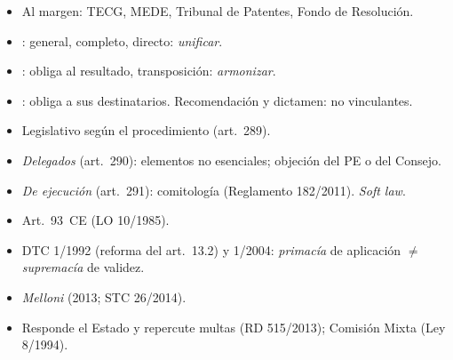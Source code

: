 \documentclass{article}
\begin{document}
\begin{columnas}
\begin{itemize}
\item Al margen: TECG, MEDE, Tribunal de Patentes, Fondo de Resolución.
\end{itemize}
\begin{itemize}
\item {}: general, completo, directo: \emph{unificar}.
\item {}: obliga al resultado, transposición: \emph{armonizar}.
\item {}: obliga a sus destinatarios. Recomendación y dictamen: no vinculantes.
\item Legislativo según el procedimiento (art.~289).
\item \emph{Delegados} (art.~290): elementos no esenciales; objeción del PE o del Consejo.
\item \emph{De ejecución} (art.~291): comitología (Reglamento 182/2011). \emph{Soft law}.
\end{itemize}
\begin{itemize}
\item Art.~93~CE (LO 10/1985).
\item DTC 1/1992 (reforma del art.~13.2) y 1/2004: \emph{primacía} de aplicación $\neq$ \emph{supremacía} de validez.
\item \emph{Melloni} (2013; STC 26/2014).
\item Responde el Estado y repercute multas (RD 515/2013); Comisión Mixta (Ley 8/1994).
\end{itemize}


\end{columnas}
\end{document}
